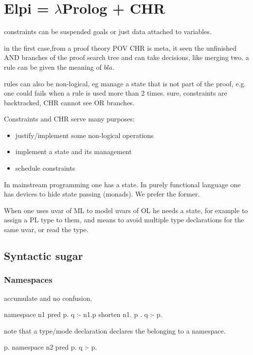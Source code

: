 \documentclass[a4paper, 11pt]{book}
\begin{document}
\section{Elpi = $\lambda$Prolog + CHR}

constraints can be suspended goals or just data attached to variables.

in the first case,from a proof theory POV CHR is meta, it seen the unfinished AND
branches of the proof search tree and can take decisions, like merging two. a rule can
be given the meaning of $bla$. 

rules can also be non-logical, eg manage a state that is not part of 
the proof, e.g. one could fails when a rule is used more than 2 times.
sure, constraints are backtracked, CHR cannot see OR branches.

 
Constraints and CHR serve many purposes:
\begin{itemize}
  \item justify/implement some non-logical operations
  \item implement a state and its management
  \item schedule constraints
\end{itemize}

In mainstream programming one has a state. In purely functional language
one has devices to hide state passing (monads). We prefer the former.

When one uses uvar of ML to model uvars of OL he needs a state, for example
to assign a PL type to them, and means to avoid multiple type declarations for the same
uvar, or read the type.


\subsection{Syntactic sugar}

\subsubsection{Namespaces}

accumulate and no confusion.

\begin{elpicode}
namespace n1 {
  pred p.
}
q :- n1.p
shorten n1.{ p }.
q :- p.
\end{elpicode}

note that a type/mode declaration declares the belonging to a namespace.

\begin{elpicode}
p.
namespace n2 {
  pred p.
  q :- p.
}
\end{elpicode}
\end{document}
